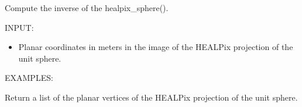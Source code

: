 \documentclass[a4paper,12ptopenany,oneside,english]{sphinxmanual}
\begin{document}
\begin{fulllineitems}
\label{\detokenize{pj_healpix:rhealpixdggs.pj_healpix.healpix_sphere_inverse}}
\pysigstartsignatures
{}
\pysigstopsignatures
\sphinxAtStartPar
Compute the inverse of the healpix\_sphere().

\sphinxAtStartPar
INPUT:
\begin{itemize}
\item {} 
\sphinxAtStartPar
{} \sphinxhyphen{} Planar coordinates in meters in the image of the
HEALPix projection of the unit sphere.

\end{itemize}

\sphinxAtStartPar
EXAMPLES:

\begin{sphinxVerbatim}[commandchars=\\\{\}]
    
\end{sphinxVerbatim}

\end{fulllineitems}


\begin{fulllineitems}
\label{\detokenize{pj_healpix:rhealpixdggs.pj_healpix.healpix_vertices}}
\pysigstartsignatures
{}
\pysigstopsignatures
\sphinxAtStartPar
Return a list of the planar vertices of the HEALPix projection of
the unit sphere.

\end{fulllineitems}
\end{document}
